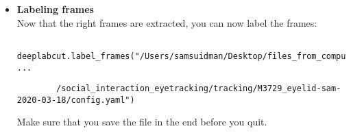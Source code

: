 \documentclass{article}
\begin{document}
\begin{itemize}
    \item \textbf{Labeling frames} \\
    Now that the right frames are extracted, you can now label the frames:
    \begin{verbatim}
        deeplabcut.label_frames("/Users/samsuidman/Desktop/files_from_computer_arne/shared_data ...
    \end{verbatim}
    \begin{verbatim}
        /social_interaction_eyetracking/tracking/M3729_eyelid-sam-2020-03-18/config.yaml")
    \end{verbatim}
    Make sure that you save the file in the end before you quit.
\end{itemize}
\end{document}
